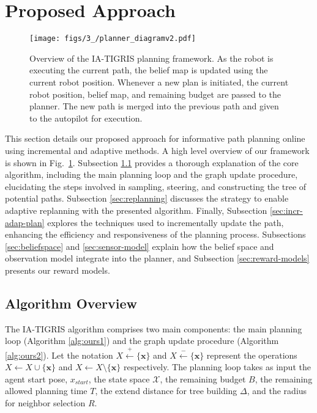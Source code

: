 \section{Proposed Approach}\label{sec:approach}

\begin{figure}[t]
\centering
\texttt{[image: figs/3\_/planner\_diagramv2.pdf]}
\caption{Overview of the IA-TIGRIS planning framework. As the robot is executing the current path, the belief map is updated using the current robot position. Whenever a new plan is initiated, the current robot position, belief map, and remaining budget are passed to the planner. The new path is merged into the previous path and given to the autopilot for execution.}
\label{fig:planner_diagram}
\end{figure}

This section details our proposed approach for informative path planning online using incremental and adaptive methods. A high level overview of our framework is shown in Fig.~\ref{fig:planner_diagram}. Subsection \ref{sec:alg_overview} provides a thorough explanation of the core algorithm, including the main planning loop and the graph update procedure, elucidating the steps involved in sampling, steering, and constructing the tree of potential paths. Subsection \ref{sec:replanning} discusses the strategy to enable adaptive replanning with the presented algorithm. Finally, Subsection \ref{sec:incr-adap-plan} explores the techniques used to incrementally update the path, enhancing the efficiency and responsiveness of the planning process. Subsections \ref{sec:beliefspace} and \ref{sec:sensor-model} explain how the belief space and observation model integrate into the planner, and Subsection \ref{sec:reward-models} presents our reward models. 

\subsection{Algorithm Overview}\label{sec:alg_overview}
% 
The IA-TIGRIS algorithm comprises two main components: the main planning loop (Algorithm \ref{alg:ours1}) and the graph update procedure (Algorithm \ref{alg:ours2}). Let the notation $X \xleftarrow{+} \{\mathbf{x}\}$ and $X \xleftarrow{-} \{\mathbf{x}\}$ represent the operations $X \leftarrow X \cup \{\mathbf{x}\}$ and $X \leftarrow X \setminus \{\mathbf{x}\}$ respectively. The \PlannerNameSpaced planning loop takes as input the agent start pose, $x_{start}$, the state space $\mathcal{X}$, the remaining budget $B$, the remaining allowed planning time $T$, the extend distance for tree building $\Delta$, and the radius for neighbor selection $R$. 


